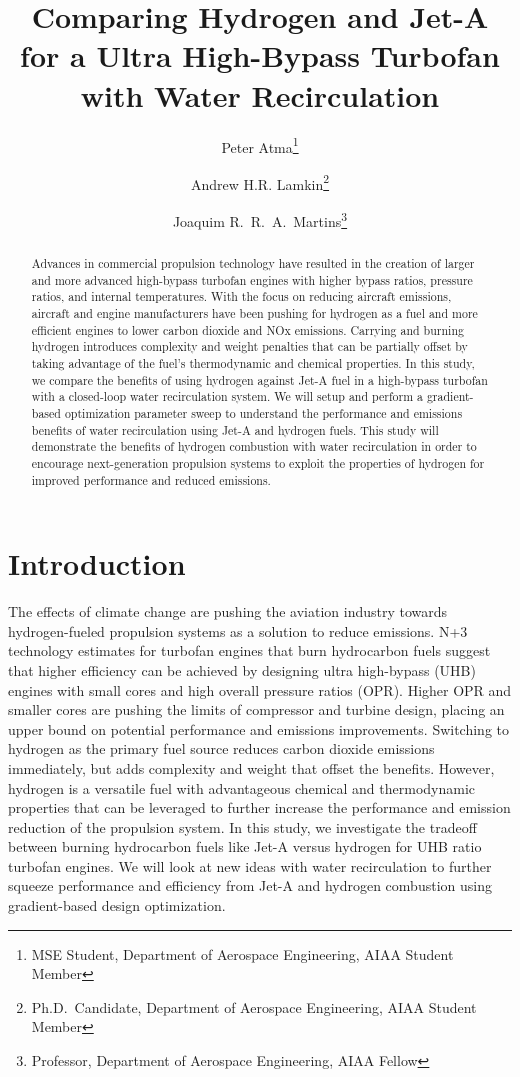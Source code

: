 \documentclass[conf]{new-aiaa}
\title{Comparing Hydrogen and Jet-A for a Ultra High-Bypass Turbofan with Water Recirculation} %
\author{Peter Atma\footnote{MSE Student, Department of Aerospace Engineering, AIAA Student Member}}
\author{Andrew H.R. Lamkin\footnote{Ph.D.~Candidate, Department of Aerospace Engineering, AIAA Student Member}}
\author{Joaquim R.~R.~A.~Martins\footnote{Professor, Department of Aerospace Engineering, AIAA Fellow}}
\affil{University of Michigan, Ann Arbor, MI, 48109}
\begin{document}
\maketitle

\begin{abstract}
	Advances in commercial propulsion technology have resulted in the creation of larger and more advanced high-bypass turbofan engines with higher bypass ratios, pressure ratios, and internal temperatures.
	With the focus on reducing aircraft emissions, aircraft and engine manufacturers have been pushing for hydrogen as a fuel and more efficient engines to lower carbon dioxide and NOx emissions.
	Carrying and burning hydrogen introduces complexity and weight penalties that can be partially offset by taking advantage of the fuel's thermodynamic and chemical properties.
	In this study, we compare the benefits of using hydrogen against Jet-A fuel in a high-bypass turbofan with a closed-loop water recirculation system.
	We will setup and perform a gradient-based optimization parameter sweep to understand the performance and emissions benefits of water recirculation using Jet-A and hydrogen fuels.
	This study will demonstrate the benefits of hydrogen combustion with water recirculation in order to encourage next-generation propulsion systems to exploit the properties of hydrogen for improved performance and reduced emissions.
\end{abstract}

\section{Introduction}
The effects of climate change are pushing the aviation industry towards hydrogen-fueled propulsion systems as a solution to reduce emissions.
N+3 technology estimates for turbofan engines that burn hydrocarbon fuels suggest that higher efficiency can be achieved by designing ultra high-bypass (UHB) engines with small cores and high overall pressure ratios (OPR).
Higher OPR and smaller cores are pushing the limits of compressor and turbine design, placing an upper bound on potential performance and emissions improvements.
Switching to hydrogen as the primary fuel source reduces carbon dioxide emissions immediately, but adds complexity and weight that offset the benefits.
However, hydrogen is a versatile fuel with advantageous chemical and thermodynamic properties that can be leveraged to further increase the performance and emission reduction of the propulsion system.
In this study, we investigate the tradeoff between burning hydrocarbon fuels like Jet-A versus hydrogen for UHB ratio turbofan engines.
We will look at new ideas with water recirculation to further squeeze performance and efficiency from Jet-A and hydrogen combustion using gradient-based design optimization.
\end{document}
